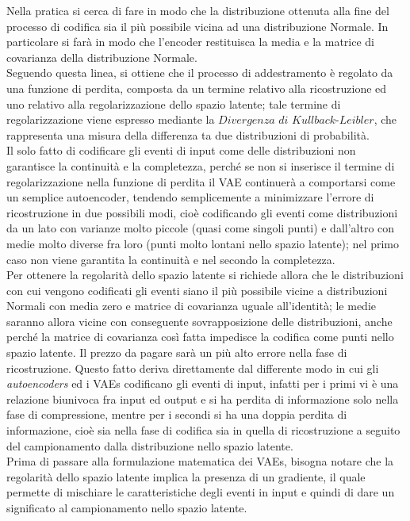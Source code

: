 Nella pratica si cerca di fare in modo che la distribuzione ottenuta alla fine del processo di codifica sia il più possibile vicina ad una distribuzione Normale. In particolare si farà in modo che l'encoder restituisca la media e la matrice di covarianza della distribuzione Normale. \\ 
Seguendo questa linea, si ottiene che il processo di addestramento è regolato da una funzione di perdita, composta da un termine relativo alla ricostruzione ed uno relativo alla regolarizzazione dello spazio latente; tale termine di regolarizzazione viene espresso mediante la $\textit{Divergenza di Kullback-Leibler}$, che rappresenta una misura della differenza ta due distribuzioni di probabilità. \\
Il solo fatto di codificare gli eventi di input come delle distribuzioni non garantisce la continuità e la completezza, perché se non si inserisce il termine di regolarizzazione nella funzione di perdita il VAE continuerà a comportarsi come un semplice autoencoder, tendendo semplicemente a minimizzare l'errore di ricostruzione in due possibili modi, cioè codificando gli eventi come distribuzioni da un lato con varianze molto piccole (quasi come singoli punti) e dall'altro con medie molto diverse fra loro (punti molto lontani nello spazio latente); nel primo caso non viene garantita la continuità e nel secondo la completezza. \\ 
Per ottenere la regolarità dello spazio latente si richiede allora che le distribuzioni con cui vengono codificati gli eventi siano il più possibile vicine a distribuzioni Normali con media zero e matrice di covarianza uguale all'identità; le medie saranno allora vicine con conseguente sovrapposizione delle distribuzioni, anche perché la matrice di covarianza così fatta impedisce la codifica come punti nello spazio latente. Il prezzo da pagare sarà un più alto errore nella fase di ricostruzione. Questo fatto deriva direttamente dal differente modo in cui gli \textit{autoencoders} ed i VAEs codificano gli eventi di input, infatti per i primi vi è una relazione biunivoca fra input ed output e si ha perdita di informazione solo nella fase di compressione, mentre per i secondi si ha una doppia perdita di informazione, cioè sia nella fase di codifica sia in quella di ricostruzione a seguito del campionamento dalla distribuzione nello spazio latente.\\
Prima di passare alla formulazione matematica dei VAEs, bisogna notare che la regolarità dello spazio latente implica la presenza di un gradiente, il quale permette di mischiare le caratteristiche degli eventi in input e quindi di dare un significato al campionamento nello spazio latente. \\

